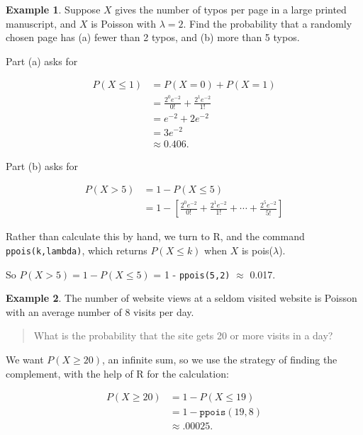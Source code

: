 \documentclass[
]{book}
\theoremstyle{definition}
\theoremstyle{definition}
\newtheorem{example}{Example}[chapter]
\theoremstyle{definition}
\theoremstyle{definition}
\theoremstyle{remark}
\begin{document}
\begin{example}
\protect\hypertarget{exm:poisson-typos}{}\label{exm:poisson-typos}Suppose \(X\) gives the number of typos per page in a large printed manuscript, and \(X\) is Poisson with \(\lambda = 2\). Find the probability that a randomly chosen page has (a) fewer than 2 typos, and (b) more than 5 typos.

Part (a) asks for

\begin{align*}
P(X\leq 1) &= P(X = 0)+P(X=1) \\
&= \frac{2^0e^{-2}}{0!}+\frac{2^1e^{-2}}{1!}\\
&= e^{-2} + 2e^{-2} \\
&=3 e^{-2} \\
&\approx 0.406.
\end{align*}

Part (b) asks for

\begin{align*}
P(X >  5) &= 1 - P(X \leq 5) \\
&= 1 - \left[ \frac{2^0e^{-2}}{0!}+\frac{2^1e^{-2}}{1!} +  \cdots + \frac{2^5e^{-2}}{5!}\right]
\end{align*}

Rather than calculate this by hand, we turn to R, and the command \texttt{ppois(k,lambda)}, which returns \(P(X \leq k)\) when \(X\) is pois(\(\lambda\)).

So \(P(X > 5) = 1 - P(X \leq 5)\) = 1 - \texttt{ppois(5,2)} \(\approx\) 0.017.
\end{example}

\begin{example}
\protect\hypertarget{exm:pois-website}{}\label{exm:pois-website}The number of website views at a seldom visited website is Poisson with an average number of 8 visits per day.

\begin{quote}
What is the probability that the site gets 20 or more visits in a day?
\end{quote}

We want \(P(X \geq 20)\), an infinite sum, so we use the strategy of finding the complement, with the help of R for the calculation:

\begin{align*}
P(X \geq 20) &= 1 - P(X \leq 19) \\
&= 1 - \texttt{ppois}(19,8)\\
&\approx .00025.
\end{align*}
\end{example}
\end{document}
